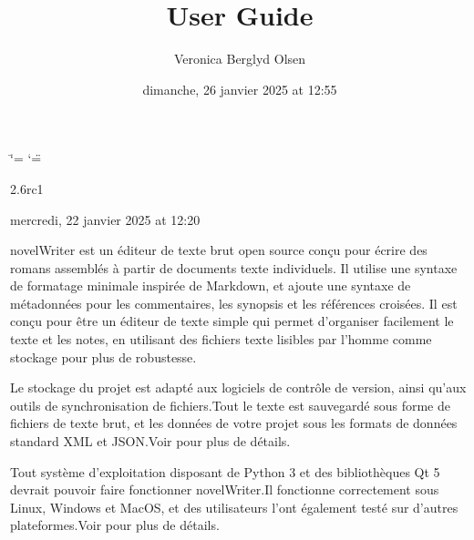 \documentclass[a4paper,11pt,french]{sphinxmanual}
\title{User Guide}
\date{dimanche, 26 janvier 2025 at 12:55}
\author{Veronica Berglyd Olsen}
\let\sphinxpxdimen\pdfpxdimen\else\newdimen\sphinxpxdimen
\begin{document}
\ifdefined\shorthandoff
  \ifnum\catcode`\=\string=\active\shorthandoff{=}\fi
  \ifnum\catcode`\"=\active{}\fi
\fi

\pagestyle{empty}
\sphinxmaketitle
\pagestyle{plain}
\sphinxtableofcontents
\pagestyle{normal}
\label{\detokenize{index::doc}}


\begin{DUlineblock}{0em}
\item[]  2.6rc1
\item[]  mercredi, 22 janvier 2025 at 12:20
\end{DUlineblock}

\sphinxAtStartPar
novelWriter est un éditeur de texte brut open source conçu pour écrire des romans assemblés à partir de documents texte individuels. Il utilise une syntaxe de formatage minimale inspirée de Markdown, et ajoute une syntaxe de métadonnées pour les commentaires, les synopsis et les références croisées. Il est conçu pour être un éditeur de texte simple qui permet d’organiser facilement le texte et les notes, en utilisant des fichiers texte lisibles par l’homme comme stockage pour plus de robustesse.

\begin{figure}[htbp]
\centering

\noindent\sphinxincludegraphics[width=500\sphinxpxdimen]{{screenshot_multi}.png}
\end{figure}

\sphinxAtStartPar
Le stockage du projet est adapté aux logiciels de contrôle de version, ainsi qu’aux outils de synchronisation de fichiers.Tout le texte est sauvegardé sous forme de fichiers de texte brut, et les données de votre projet sous les formats de données standard XML et JSON.Voir {\hyperref[\detokenize{tech_storage:a-storage}]{}} pour plus de détails.

\sphinxAtStartPar
Tout système d’exploitation disposant de Python 3 et des bibliothèques Qt 5 devrait pouvoir faire fonctionner novelWriter.Il fonctionne correctement sous Linux, Windows et MacOS, et des utilisateurs l’ont également testé sur d’autres plateformes.Voir {\hyperref[\detokenize{int_started:a-started}]{}} pour plus de détails.
\end{document}
